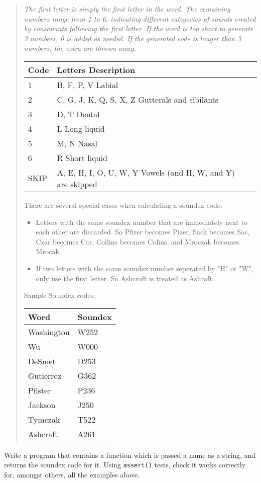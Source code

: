 \begin{quote}
{\it 
The first letter is simply the first letter in the word. The remaining numbers range from 1 to 6, indicating different categories of sounds created by consonants following the first letter. If the word is too short to generate 3 numbers, 0 is added as needed. If the generated code is longer than 3 numbers, the extra are thrown away.

\begin{center}
\begin{tabular}{|l|l|l|}\hline
Code& 	Letters	Description \\ \hline
1	& B, F, P, V	Labial \\ \hline
2	& C, G, J, K, Q, S, X, Z	Gutterals and sibilants \\ \hline
3	& D, T	Dental \\ \hline
4	& L	Long liquid \\ \hline
5	& M, N	Nasal \\ \hline
6	& R	Short liquid \\ \hline
SKIP	& A, E, H, I, O, U, W, Y	Vowels (and H, W, and Y) are skipped \\ \hline
\end{tabular}
\end{center}

There are several special cases when calculating a soundex code:

\begin{itemize}
\item Letters with the same soundex number that are immediately next to each other are discarded. So Pfizer becomes Pizer, Sack becomes Sac, Czar becomes Car, Collins becomes Colins, and Mroczak becomes Mrocak.
\item If two letters with the same soundex number seperated by "H" or "W", only use the first letter. So Ashcroft is treated as Ashroft.
\end{itemize}

Sample Soundex codes:

\begin{center}
\begin{tabular}{|l|l|} \hline
Word	 	& Soundex \\ \hline
Washington	& W252 \\ \hline
Wu	 	& W000 \\ \hline
DeSmet	 	& D253 \\ \hline
Gutierrez	& G362 \\ \hline
Pfister	 	& P236 \\ \hline
Jackson	 	& J250 \\ \hline
Tymczak	 	& T522 \\ \hline
Ashcraft	& A261 \\ \hline
\end{tabular}
\end{center}
}
\end{quote}

\begin{exercise}

Write a program that contains a function which is passed a name as a
string, and returns the soundex code for it.  Using \verb^assert()^ tests,
check it works correctly for, amongst others, all the examples above.

\end{exercise}
